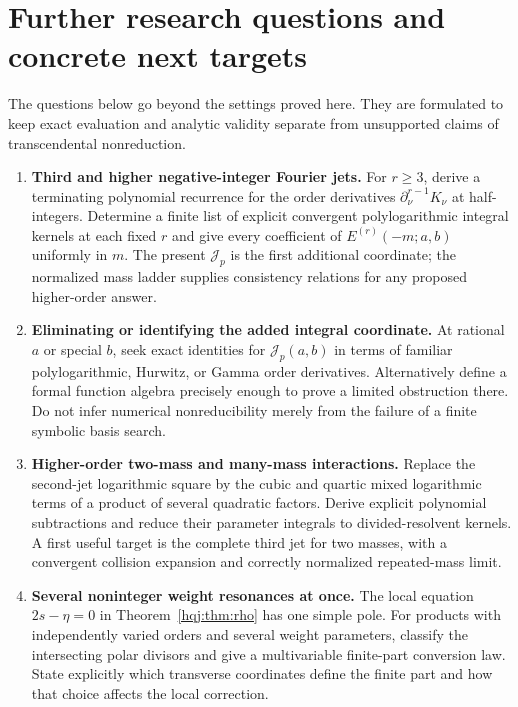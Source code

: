 \section{Further research questions and concrete next targets}
\label{hqj:sec:research}

The questions below go beyond the settings proved here. They are
formulated to keep exact evaluation and analytic validity separate from
unsupported claims of transcendental nonreduction.

\begin{enumerate}
\item \textbf{Third and higher negative-integer Fourier jets.}
For $r\ge3$, derive a terminating polynomial recurrence for the
order derivatives $\partial_\nu^{r-1}K_\nu$ at half-integers.
Determine a finite list of explicit convergent polylogarithmic
integral kernels at each fixed $r$ and give every coefficient of
$E^{(r)}(-m;a,b)$ uniformly in $m$. The present $\mathcal J_p$ is the
first additional coordinate; the normalized mass ladder supplies
consistency relations for any proposed higher-order answer.

\item \textbf{Eliminating or identifying the added integral coordinate.}
At rational $a$ or special $b$, seek exact identities for
$\mathcal J_p(a,b)$ in terms of familiar polylogarithmic, Hurwitz,
or Gamma order derivatives. Alternatively define a formal function
algebra precisely enough to prove a limited obstruction there.
Do not infer numerical nonreducibility merely from the failure of a
finite symbolic basis search.

\item \textbf{Higher-order two-mass and many-mass interactions.}
Replace the second-jet logarithmic square by the cubic and quartic
mixed logarithmic terms of a product of several quadratic factors.
Derive explicit polynomial subtractions and reduce their parameter
integrals to divided-resolvent kernels. A first useful target is the
complete third jet for two masses, with a convergent collision
expansion and correctly normalized repeated-mass limit.

\item \textbf{Several noninteger weight resonances at once.}
The local equation $2s-\eta=0$ in Theorem~\ref{hqj:thm:rho} has one
simple pole. For products with independently varied orders and
several weight parameters, classify the intersecting polar divisors
and give a multivariable finite-part conversion law. State explicitly
which transverse coordinates define the finite part and how that
choice affects the local correction.


\end{enumerate}

